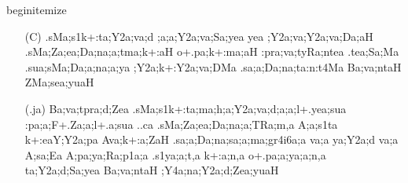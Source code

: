 begin{itemize} 
\item[]		 \begin{itemize}         
          \item[({\sktf C})] {\sktf .sMa;s1k+:ta;Y2a;va;d%
;a;a;Y2a;va;Sa;yea yea ;Y2a;va;Y2a;va;Da;aH
.sMa;Za;ea;Da;na;a;tma;k+:aH o+.pa;k+:ma;aH
:pra;va;tyRa;ntea\ZF{,} .tea;Sa;Ma .sua;sMa;Da;a;na;a;ya ;Y2a;k+:Y2a;va;DMa .sa;a;Da;na;ta:n:t4Ma
Ba;va;ntaH ZMa;sea;yuaH}
          
          \item[({\sktf .ja})] {\sktf Ba;va;tpra;d;Zea
.sMa;s1k+:ta;ma;h;a;Y2a;va;d;a;a;l+.yea;sua
:pa;a;F+.Za;a;l+.a;sua ..ca .sMa;Za;ea;Da;na;a;TRa;m,a
A;a;s1ta k+:eaY;Y2a;pa Ava;k+:a;ZaH .sa;a;Da;na;sa;a;ma;gr4i6a;a va;a  ya;Y2a;d va;a
A;sa;Ea A;pa;ya;Ra;p1a;a .s1ya;a;t,a\ZF{,} k+:a;n,a o+.pa;a;ya;a;n,a
ta;Y2a;d;Sa;yea Ba;va;ntaH ;Y4a;na;Y2a;d;Zea;yuaH%
}
          
         \end{itemize}


